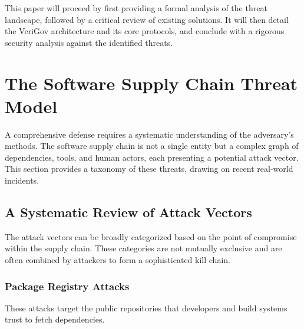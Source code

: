 \documentclass{article}
\begin{document}
This paper will proceed by first providing a formal analysis of the threat landscape, followed by a critical review of existing solutions. It will then detail the VeriGov architecture and its core protocols, and conclude with a rigorous security analysis against the identified threats.

\section{The Software Supply Chain Threat Model}
\label{sec:the-software-supply-chain-threat-model}

A comprehensive defense requires a systematic understanding of the adversary's methods. The software supply chain is not a single entity but a complex graph of dependencies, tools, and human actors, each presenting a potential attack vector. This section provides a taxonomy of these threats, drawing on recent real-world incidents.

\subsection{A Systematic Review of Attack Vectors}

The attack vectors can be broadly categorized based on the point of compromise within the supply chain. These categories are not mutually exclusive and are often combined by attackers to form a sophisticated kill chain.

\subsubsection{Package Registry Attacks}

These attacks target the public repositories that developers and build systems trust to fetch dependencies.
\end{document}
